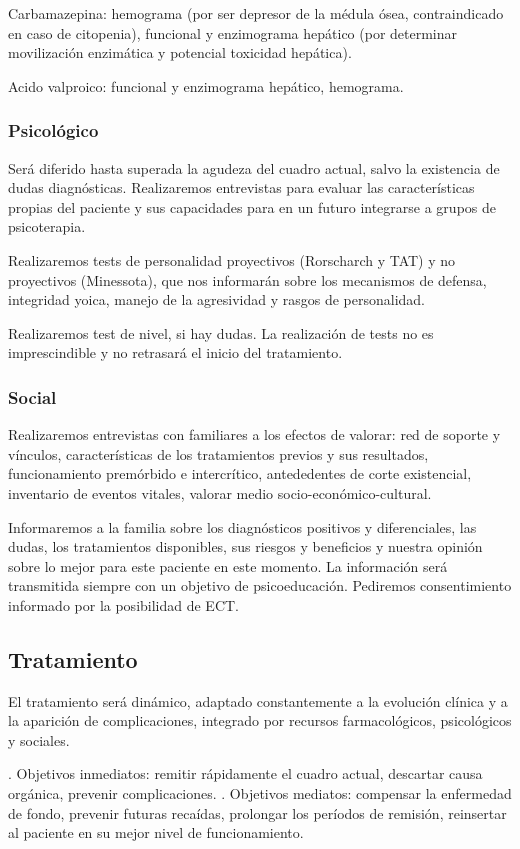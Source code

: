 \documentclass{scrbook}
\begin{document}
Carbamazepina: hemograma (por ser depresor de la médula ósea, contraindicado en caso de citopenia), funcional y enzimograma hepático (por determinar movilización enzimática y potencial toxicidad hepática).

Acido valproico: funcional y enzimograma hepático, hemograma.
\subsubsection*{Psicológico}
Será diferido hasta superada la agudeza del cuadro actual, salvo la existencia de dudas diagnósticas. Realizaremos entrevistas para evaluar las características propias del paciente y sus capacidades para en un futuro integrarse a grupos de psicoterapia.

Realizaremos tests de personalidad proyectivos (Rorscharch y TAT) y no proyectivos (Minessota), que nos informarán sobre los mecanismos de defensa, integridad yoica, manejo de la agresividad y rasgos de personalidad.

Realizaremos test de nivel, si hay dudas. La realización de tests no es imprescindible y no retrasará el inicio del tratamiento.
\subsubsection*{Social}
Realizaremos entrevistas con familiares a los efectos de valorar: red de soporte y vínculos, características de los tratamientos previos y sus resultados, funcionamiento premórbido e intercrítico, antededentes de corte existencial, inventario de eventos vitales, valorar medio socio-económico-cultural.

Informaremos a la familia sobre los diagnósticos positivos y diferenciales, las dudas, los tratamientos disponibles, sus riesgos y beneficios y nuestra opinión sobre lo mejor para este paciente en este momento. La información será transmitida siempre con un objetivo de psicoeducación. Pediremos consentimiento informado por la posibilidad de ECT.
\subsection*{Tratamiento}
El tratamiento será dinámico, adaptado constantemente a la evolución clínica y a la aparición de complicaciones, integrado por recursos farmacológicos, psicológicos y sociales\cite{yatham2018canadian}.

. Objetivos inmediatos: remitir rápidamente el cuadro actual, descartar causa orgánica, prevenir complicaciones.
. Objetivos mediatos: compensar la enfermedad de fondo, prevenir futuras recaídas, prolongar los períodos de remisión, reinsertar al paciente en su mejor nivel de funcionamiento.
\end{document}
